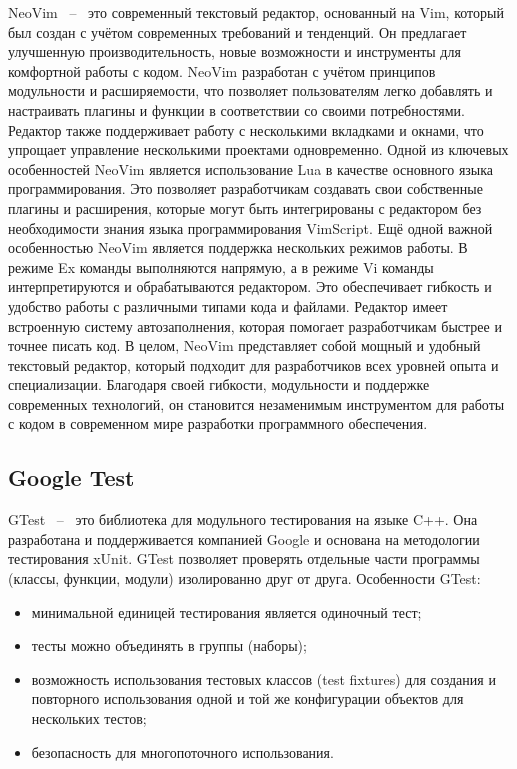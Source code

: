 NeoVim ~--~ это современный текстовый редактор, основанный на Vim, который был создан с учётом современных требований и тенденций. Он предлагает улучшенную производительность, новые возможности и инструменты для комфортной работы с кодом.
NeoVim разработан с учётом принципов модульности и расширяемости, что позволяет пользователям легко добавлять и настраивать плагины и функции в соответствии со своими потребностями. Редактор также поддерживает работу с несколькими вкладками и окнами, что упрощает управление несколькими проектами одновременно.
Одной из ключевых особенностей NeoVim является использование Lua в качестве основного языка программирования. Это позволяет разработчикам создавать свои собственные плагины и расширения, которые могут быть интегрированы с редактором без необходимости знания языка программирования VimScript.
Ещё одной важной особенностью NeoVim является поддержка нескольких режимов работы. В режиме Ex команды выполняются напрямую, а в режиме Vi команды интерпретируются и обрабатываются редактором. Это обеспечивает гибкость и удобство работы с различными типами кода и файлами.
Редактор имеет встроенную систему автозаполнения, которая помогает разработчикам быстрее и точнее писать код.
В целом, NeoVim представляет собой мощный и удобный текстовый редактор, который подходит для разработчиков всех уровней опыта и специализации. Благодаря своей гибкости, модульности и поддержке современных технологий, он становится незаменимым инструментом для работы с кодом в современном мире разработки программного обеспечения.

\subsection{Google Test}
GTest ~--~ это библиотека для модульного тестирования на языке C++. Она разработана и поддерживается компанией Google и основана на методологии тестирования xUnit. GTest позволяет проверять отдельные части программы (классы, функции, модули) изолированно друг от друга.
Особенности GTest:
\begin{itemize}
\item минимальной единицей тестирования является одиночный тест;
\item тесты можно объединять в группы (наборы);
\item возможность использования тестовых классов (test fixtures) для создания и повторного использования одной и той же конфигурации объектов для нескольких тестов;
\item безопасность для многопоточного использования.
\end{itemize}

